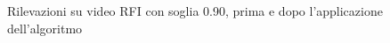\begin{figure}[]
    \begin{minipage}{.5\linewidth}
        \centering
    \end{minipage}%
    \begin{minipage}{.5\linewidth}
        \centering
    \end{minipage}
    \centering
    \caption{Rilevazioni su video RFI con soglia 0.90, prima e dopo l'applicazione dell'algoritmo}
    \label{fig:alg_1}
\end{figure}